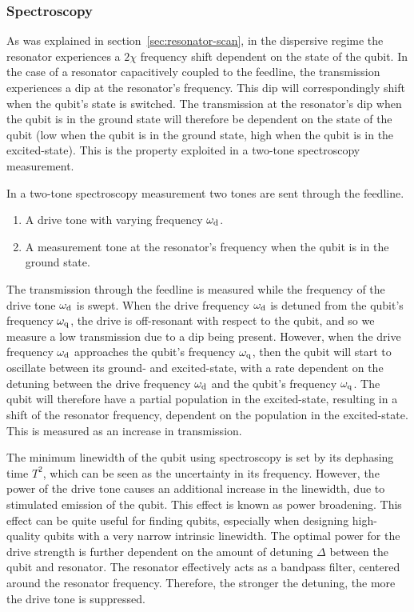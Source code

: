         \subsubsection{Spectroscopy}
          As was explained in section~\ref{sec:resonator-scan}, in the dispersive regime the resonator experiences a $2 \chi$ frequency shift dependent on the state of the qubit. In the case of a resonator capacitively coupled to the feedline, the transmission experiences a dip at the resonator's frequency. This dip will correspondingly shift when the qubit's state is switched. The transmission at the resonator's dip when the qubit is in the ground state will therefore be dependent on the state of the qubit (low when the qubit is in the ground state, high when the qubit is in the excited-state). This is the property exploited in a two-tone spectroscopy measurement.

          In a two-tone spectroscopy measurement two tones are sent through the feedline.
          \begin{enumerate}
            \item A drive tone with varying frequency $\omega_\text{d}$.
            \item A measurement tone at the resonator's frequency when the qubit is in the ground state.
          \end{enumerate}

          The transmission through the feedline is measured while the frequency of the drive tone $\omega_\text{d}$ is swept. When the drive frequency $\omega_\text{d}$ is detuned from the qubit's frequency $\omega_\text{q}$, the drive is off-resonant with respect to the qubit, and so we measure a low transmission due to a dip being present. However, when the drive frequency $\omega_\text{d}$ approaches the qubit's frequency $\omega_\text{q}$, then the qubit will start to oscillate between its ground- and excited-state, with a rate dependent on the detuning between the drive frequency $\omega_\text{d}$ and the qubit's frequency $\omega_\text{q}$. The qubit will therefore have a partial population in the excited-state, resulting in a shift of the resonator frequency, dependent on the population in the excited-state. This is measured as an increase in transmission.

          The minimum linewidth of the qubit using spectroscopy is set by its dephasing time $T^2$, which can be seen as the uncertainty in its frequency. However, the power of the drive tone causes an additional increase in the linewidth, due to stimulated emission of the qubit. This effect is known as power broadening. This effect can be quite useful for finding qubits, especially when designing high-quality qubits with a very narrow intrinsic linewidth. The optimal power for the drive strength is further dependent on the amount of detuning $\Delta$ between the qubit and resonator. The resonator effectively acts as a bandpass filter, centered around the resonator frequency. Therefore, the stronger the detuning, the more the drive tone is suppressed.

